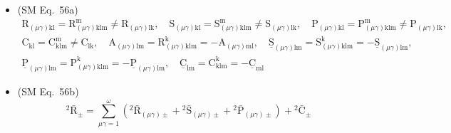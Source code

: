 \documentclass[12pt]{article}
\begin{document}
\begin{itemize}[label={},leftmargin=0pt]
    \item (SM Eq.\ 56a) 
    \[
    \begin{gathered}
    \mathrm{R}_{(\mu\gamma)\mathrm{kl}} = \mathrm{R}^\mathrm{m}_{(\mu\gamma)\mathrm{klm}} \ne \mathrm{R}_{(\mu\gamma)\mathrm{lk}}, \quad \mathrm{S}_{(\mu\gamma)\mathrm{kl}} = \mathrm{S}^\mathrm{m}_{(\mu\gamma)\mathrm{klm}} \ne \mathrm{S}_{(\mu\gamma)\mathrm{lk}}, \quad \mathrm{P}_{(\mu\gamma)\mathrm{kl}} = \mathrm{P}^\mathrm{m}_{(\mu\gamma)\mathrm{klm}} \ne \mathrm{P}_{(\mu\gamma)\mathrm{lk}}, \\
    \mathrm{C}_{\mathrm{kl}} = \mathrm{C}^\mathrm{m}_{\mathrm{klm}} \ne \mathrm{C}_{\mathrm{lk}}, \quad \mathrm{A}_{(\mu\gamma)\mathrm{lm}} = \mathrm{R}^\mathrm{k}_{(\mu\gamma)\mathrm{klm}} = -\mathrm{A}_{(\mu\gamma)\mathrm{ml}}, \quad \underline{\mathrm{S}}_{(\mu\gamma)\mathrm{lm}} = \mathrm{S}^\mathrm{k}_{(\mu\gamma)\mathrm{klm}} = -\underline{\mathrm{S}}_{(\mu\gamma)\mathrm{lm}}, \\
    \underline{\mathrm{P}}_{(\mu\gamma)\mathrm{lm}} = \mathrm{P}^\mathrm{k}_{(\mu\gamma)\mathrm{klm}} = -\underline{\mathrm{P}}_{(\mu\gamma)\mathrm{lm}}, \quad \underline{\mathrm{C}}_{\mathrm{lm}} = \mathrm{C}^\mathrm{k}_{\mathrm{klm}} = -\underline{\mathrm{C}}_{\mathrm{ml}}
    \end{gathered}
    \]

    \item (SM Eq.\ 56b) 
    \[
    {}^2\bar{\mathrm{R}}_\pm = \sum_{\mu\gamma=1}^{\omega} \left( {}^2\bar{\mathrm{R}}_{(\mu\gamma)\pm} + {}^2\bar{\mathrm{S}}_{(\mu\gamma)\pm} + {}^2\bar{\mathrm{P}}_{(\mu\gamma)\pm} \right) + {}^2\bar{\mathrm{C}}_\pm
    \]


\end{itemize}
\end{document}
